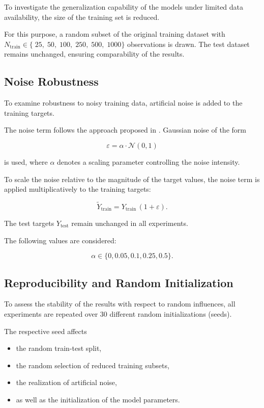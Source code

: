 To investigate the generalization capability
of the models under limited data availability,
the size of the training set is reduced.

For this purpose, a random subset of the original
training dataset with
$N_{\text{train}} \in \{\;25,\;50,\;100,\;250,\;500,\;1000\}$
observations is drawn.
The test dataset remains unchanged,
ensuring comparability of the results.

\subsection{Noise Robustness}
\label{sec:mt-noise}

To examine robustness to noisy training data,
artificial noise is added to the training targets.

The noise term follows the approach proposed in
\cite{mitarai2018quantum}.
Gaussian noise of the form

\begin{equation}
    \varepsilon = \alpha \cdot \mathcal{N}(0,1)
\end{equation}

is used, where $\alpha$ denotes a scaling parameter
controlling the noise intensity.

To scale the noise relative to the magnitude
of the target values, the noise term is applied
multiplicatively to the training targets:

\begin{equation}
    \widetilde{Y}_{\text{train}} = Y_{\text{train}} \,(1 + \varepsilon).
\end{equation}

The test targets $Y_{\text{test}}$ remain unchanged
in all experiments.

The following values are considered:

\[
\alpha \in \{0, 0.05, 0.1, 0.25, 0.5\}.
\]

\subsection{Reproducibility and Random Initialization}
\label{sec:mt-seeds}

To assess the stability of the results with respect
to random influences, all experiments are repeated
over 30 different random initializations (seeds).

The respective seed affects

\begin{itemize}
    \item the random train-test split,
    \item the random selection of reduced training subsets,
    \item the realization of artificial noise,
    \item as well as the initialization of the model parameters.
\end{itemize}

